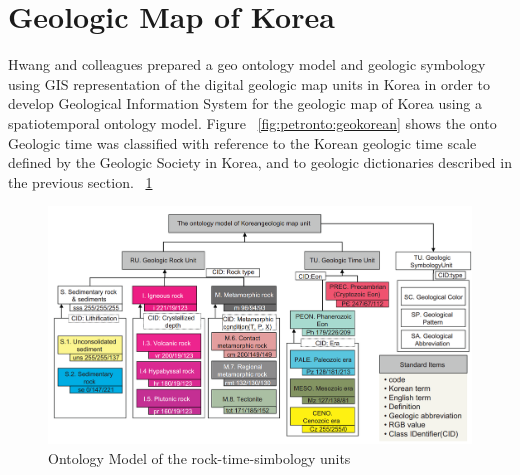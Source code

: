 \section{Geologic Map of Korea}
Hwang and colleagues \citeyearpar{hwang:2012} prepared a geo ontology model and geologic symbology using GIS representation of the digital geologic map units in Korea in order to develop Geological Information System for the geologic map of Korea using a spatiotemporal ontology model. 
Figure ~\ref{fig:petronto:geokorean} shows the onto
Geologic time was classified  with reference to the Korean geologic time scale defined by the Geologic Society in Korea, and to geologic dictionaries described in the previous section. 
~\ref{fig:petronto:geokorean2}
\begin{figure}[ht b]
  \begin{center}
    \includegraphics[width=1.0\linewidth]{ch-petro-onto/figures/geokorean}
    \caption{Ontology Model of the rock-time-simbology units~\cite{hwang:2012}}
    \label{fig:petronto:geokorean2}
  \end{center}
\end{figure}

